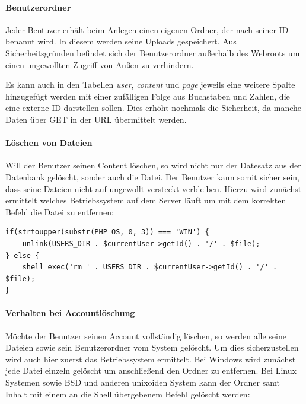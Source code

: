 \documentclass[10pt]{scrarticle}
\begin{document}
\paragraph{Benutzerordner}

Jeder Bentuzer erhält beim Anlegen einen eigenen Ordner, der nach seiner ID benannt wird. In diesem werden seine Uploads gespeichert. Aus Sicherheitsgründen befindet sich der Benutzerordner außerhalb des Webroots um einen ungewollten Zugriff von Außen zu verhindern.

\begin{infobox}[Alternative:]
Es kann auch in den Tabellen \textit{user}, \textit{content} und \textit{page} jeweils eine weitere Spalte hinzugefügt werden mit einer zufälligen Folge aus Buchstaben und Zahlen, die eine externe ID darstellen sollen. Dies erhöht nochmals die Sicherheit, da manche Daten über GET in der URL übermittelt werden.
\end{infobox}

\paragraph{Löschen von Dateien}
Will der Benutzer seinen Content löschen, so wird nicht nur der Datesatz aus der Datenbank gelöscht, sonder auch die Datei. Der Benutzer kann somit sicher sein, dass seine Dateien nicht auf ungewollt versteckt verbleiben. Hierzu wird zunächst ermittelt welches Betriebssystem auf dem Server läuft um mit dem korrekten Befehl die Datei zu entfernen:

\lstset{firstnumber=53}
\begin{lstlisting}
if(strtoupper(substr(PHP_OS, 0, 3)) === 'WIN') {
    unlink(USERS_DIR . $currentUser->getId() . '/' . $file);
} else {
    shell_exec('rm ' . USERS_DIR . $currentUser->getId() . '/' . $file);
}
\end{lstlisting}

\paragraph{Verhalten bei Accountlöschung}
Möchte der Benutzer seinen Account vollständig löschen, so werden alle seine Dateien sowie sein Benutzerordner vom System gelöscht. Um dies sicherzustellen wird auch hier zuerst das Betriebssystem ermittelt. Bei Windows wird zunächst jede Datei einzeln gelöscht um anschließend den Ordner zu entfernen. Bei Linux Systemen sowie BSD und anderen unixoiden System kann der Ordner samt Inhalt mit einem an die Shell übergebenem Befehl gelöscht werden:
\end{document}
